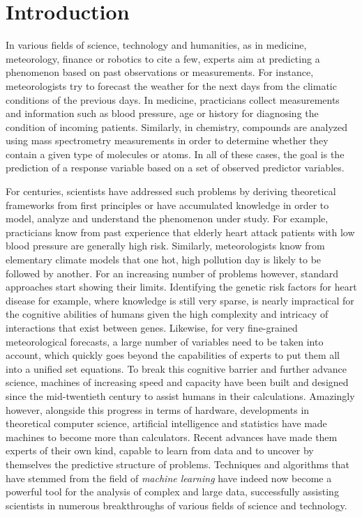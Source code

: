 \chapter{Introduction}\label{ch:introduction}

In various fields of science, technology and humanities, as in medicine,
meteorology, finance or robotics to cite a few, experts aim at predicting a
phenomenon based on past observations or measurements. For instance,
meteorologists try to forecast the weather for the next days from the climatic
conditions of the previous days. In medicine, practicians collect measurements
and information such as blood pressure, age or history for diagnosing the
condition of incoming patients. Similarly, in chemistry, compounds are analyzed
using mass spectrometry measurements in order to determine whether they contain
a given type of molecules or atoms. In all of these cases, the goal is
the prediction of a response variable based on a set of observed predictor
variables.

For centuries, scientists have addressed such problems by deriving
theoretical frameworks from first principles or have accumulated knowledge in
order to model, analyze and understand the pheno\-menon under study. For
example, practicians know from past experience that elderly heart attack
patients with low blood pressure are generally high risk. Similarly,
meteorologists know from elementary climate models that one hot, high pollution
day is likely to be followed by another. For an increasing number of problems
however, standard approaches start showing their limits. Identifying the
genetic risk factors for heart disease for example, where knowledge is still
very sparse, is nearly impractical for the cognitive abilities of humans given
the high complexity and intricacy of interactions that exist between genes.
Likewise, for very fine-grained meteorological forecasts, a large number of
variables need to be taken into account, which quickly goes beyond the
capabilities of experts to put them all into a unified set equations. To break
this cognitive barrier and further advance science, machines of increasing
speed and capacity have been built and designed since the mid-twentieth century
to assist humans in their calculations. Amazingly however, alongside this progress in
terms of hardware, developments in theoretical computer science, artificial
intelligence and statistics have made machines to become more than calculators.
Recent advances have made them experts of their own kind, capable to learn from
data and to uncover by themselves the predictive structure of problems.
Techniques and algorithms that have stemmed from the field of {\it machine
learning} have indeed now become a powerful tool for the analysis of complex and large
data, successfully assisting scientists in numerous breakthroughs of various
fields of science and technology.


